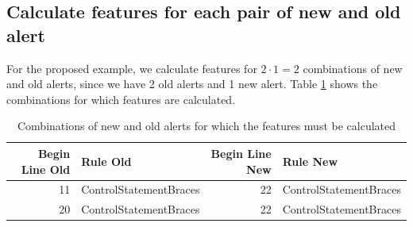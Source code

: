 \documentclass[
]{article}
\begin{document}
\small

\begin{table}[H]

\caption{\label{tab:showing map }Relation between lines of the old version and lines of the new version\label{table_map}}
\centering
{}
\end{table}

\normalsize

\subsection{Calculate features for each pair of new and old alert}

For the proposed example, we calculate features for \(2 \cdot 1 = 2\)
combinations of new and old alerts, since we have 2 old alerts and 1 new
alert. Table \ref{combination} shows the combinations for which features
are calculated.

\small

\begin{table}[H]

\caption{\label{tab:unnamed-chunk-6}Combinations of new and old alerts for which the features must be calculated \label{combination}}
\centering
\begin{tabular}[t]{r|l|r|l}
\hline
Begin Line Old & Rule Old & Begin Line New & Rule New\\
\hline
11 & ControlStatementBraces & 22 & ControlStatementBraces\\
\hline
20 & ControlStatementBraces & 22 & ControlStatementBraces\\
\hline
\end{tabular}
\end{table}

\normalsize

\vspace{16pt}
\end{document}
